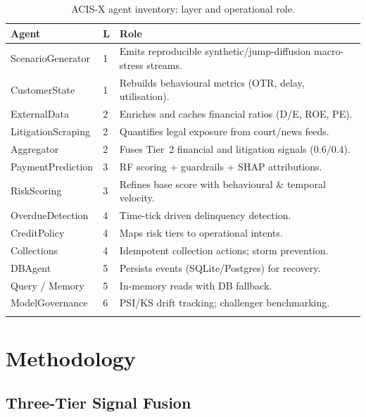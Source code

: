 \documentclass[pdflatex,sn-mathphys-num]{sn-jnl}
\theoremstyle{thmstyleone}
\theoremstyle{thmstyletwo}
\theoremstyle{thmstylethree}
\begin{document}
\begin{table}[htbp]
\caption{ACIS-X agent inventory: layer and operational role.}\label{tab:agents}
\centering\footnotesize
\begin{tabular}{@{}llp{5.2cm}@{}}
\toprule
\textbf{Agent} & \textbf{L} & \textbf{Role} \\
\midrule
ScenarioGenerator  & 1 & Emits reproducible synthetic/jump-diffusion macro-stress streams. \\
CustomerState      & 1 & Rebuilds behavioural metrics (OTR, delay, utilisation). \\
ExternalData       & 2 & Enriches and caches financial ratios (D/E, ROE, PE). \\
LitigationScraping & 2 & Quantifies legal exposure from court/news feeds. \\
Aggregator         & 2 & Fuses Tier~2 financial and litigation signals ($0.6/0.4$). \\
PaymentPrediction  & 3 & RF scoring + guardrails + SHAP attributions. \\
RiskScoring        & 3 & Refines base score with behavioural \& temporal velocity. \\
OverdueDetection   & 4 & Time-tick driven delinquency detection. \\
CreditPolicy       & 4 & Maps risk tiers to operational intents. \\
Collections        & 4 & Idempotent collection actions; storm prevention. \\
DBAgent            & 5 & Persists events (SQLite/Postgres) for recovery. \\
Query / Memory     & 5 & In-memory reads with DB fallback. \\
ModelGovernance    & 6 & PSI/KS drift tracking; challenger benchmarking. \\
\botrule
\end{tabular}
\end{table}

\section{Methodology}\label{sec:methods}

\subsection{Three-Tier Signal Fusion}\label{subsec:fusion}
\end{document}
